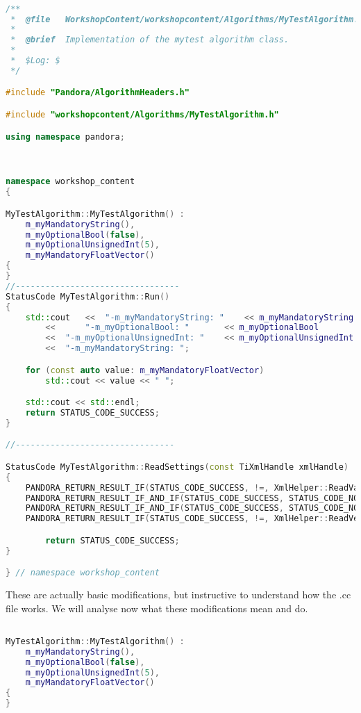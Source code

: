\begin{lstlisting}[language=C++, caption=Python example]

/**
 *  @file   WorkshopContent/workshopcontent/Algorithms/MyTestAlgorithm.cc
 * 
 *  @brief  Implementation of the mytest algorithm class.
 * 
 *  $Log: $
 */

#include "Pandora/AlgorithmHeaders.h"

#include "workshopcontent/Algorithms/MyTestAlgorithm.h"

using namespace pandora;



namespace workshop_content
{

MyTestAlgorithm::MyTestAlgorithm() :
    m_myMandatoryString(),
    m_myOptionalBool(false),
    m_myOptionalUnsignedInt(5),
    m_myMandatoryFloatVector()
{
}
//---------------------------------
StatusCode MyTestAlgorithm::Run()
{
    std::cout	<<	"-m_myMandatoryString: " 	<< m_myMandatoryString 		<< std::endl
		<<      "-m_myOptionalBool: "	 	<< m_myOptionalBool    		<< std::endl
		<<	"-m_myOptionalUnsignedInt: "	<< m_myOptionalUnsignedInt	<< std::endl
		<<	"-m_myMandatoryString: ";	

    for (const auto value: m_myMandatoryFloatVector)
        std::cout << value << " ";    

    std::cout << std::endl;
    return STATUS_CODE_SUCCESS;
}

//--------------------------------

StatusCode MyTestAlgorithm::ReadSettings(const TiXmlHandle xmlHandle)
{
	PANDORA_RETURN_RESULT_IF(STATUS_CODE_SUCCESS, !=, XmlHelper::ReadValue(xmlHandle,"MyMandatoryString", m_myMandatoryString));
	PANDORA_RETURN_RESULT_IF_AND_IF(STATUS_CODE_SUCCESS, STATUS_CODE_NOT_FOUND, !=, XmlHelper::ReadValue(xmlHandle,"MyOptionalBool", m_myOptionalBool));
	PANDORA_RETURN_RESULT_IF_AND_IF(STATUS_CODE_SUCCESS, STATUS_CODE_NOT_FOUND, !=, XmlHelper::ReadValue(xmlHandle,"MyOptionalUnsignedInt", m_myOptionalUnsignedInt));
	PANDORA_RETURN_RESULT_IF(STATUS_CODE_SUCCESS, !=, XmlHelper::ReadVectorOfValues(xmlHandle,"MyMandatoryFloatVector", m_myMandatoryFloatVector));

        return STATUS_CODE_SUCCESS;
}

} // namespace workshop_content


\end{lstlisting}

These are actually basic modifications, but instructive to understand how the .cc file works. We will analyse now what these modifications mean and do.
\begin{lstlisting}[language=C++, caption=Python example]

MyTestAlgorithm::MyTestAlgorithm() :
    m_myMandatoryString(),
    m_myOptionalBool(false),
    m_myOptionalUnsignedInt(5),
    m_myMandatoryFloatVector()
{
}

\end{lstlisting}


